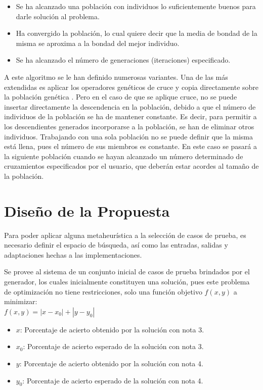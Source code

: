 \documentclass[a4paper,openright,11pt,oneside]{book}
\begin{document}
		\begin{itemize}
			\item Se ha alcanzado una población con individuos lo suficientemente buenos para darle solución al problema.
			\item Ha convergido la población, lo cual quiere decir que la  media  de  bondad  de  la  misma  se aproxima a la bondad del mejor individuo.
			\item Se ha alcanzado el número de generaciones (iteraciones) especificado.
		\end{itemize}
	
		A este algoritmo se le han definido numerosas variantes. Una de las más extendidas es aplicar los operadores genéticos de cruce y copia directamente sobre la población genética \cite{AlgGen}. Pero en el caso de que se aplique cruce, no se puede insertar directamente la descendencia en la población, debido a que el número de individuos de la población se ha de mantener constante. Es decir, para permitir a los descendientes generados incorporarse a la población, se  han  de  eliminar  otros individuos. Trabajando con una sola población no se puede definir que la misma está llena, pues el número de sus miembros es constante. En este caso se pasará a la siguiente población cuando se hayan alcanzado un número determinado de cruzamientos especificados por el usuario, que deberán estar acordes al tamaño de la población.
		
\chapter{Diseño de la Propuesta}

	Para poder aplicar alguna metaheurística a la selección de casos de prueba, es necesario definir el espacio de búsqueda, así como las entradas, salidas y adaptaciones hechas a las implementaciones.
	
	Se provee al sistema de un conjunto inicial de casos de prueba brindados por el generador, los cuales inicialmente constituyen una solución, pues este problema de optimización no tiene restricciones, solo una función objetivo $f(x,y)$ a minimizar: \\
	
	$f(x,y) = |x - x_0| + |y - y_0|$ \label{fo}
	
	\begin{itemize}
		\item $x$: Porcentaje de acierto obtenido por la solución con nota 3.
		\item $x_0$: Porcentaje de acierto esperado de la solución con nota 3.
		\item $y$: Porcentaje de acierto obtenido por la solución con nota 4.
		\item $y_0$: Porcentaje de acierto esperado de la solución con nota 4.
	\end{itemize}
\end{document}
